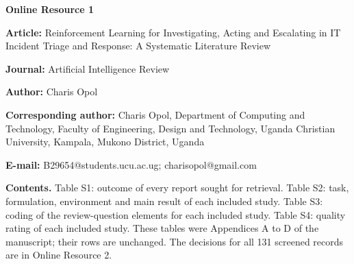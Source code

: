 \documentclass[10pt]{article}
\begin{document}
{\large\textbf{Online Resource 1}}\par\medskip
\textbf{Article:} Reinforcement Learning for Investigating, Acting and Escalating in IT Incident Triage and Response: A Systematic Literature Review\par
\textbf{Journal:} Artificial Intelligence Review\par
\textbf{Author:} Charis Opol\par
\textbf{Corresponding author:} Charis Opol, Department of Computing and Technology, Faculty of Engineering, Design and Technology, Uganda Christian University, Kampala, Mukono District, Uganda\par
\textbf{E-mail:} B29654@students.ucu.ac.ug; charisopol@gmail.com\par\medskip
\textbf{Contents.} Table S1: outcome of every report sought for retrieval. Table S2: task, formulation, environment and main result of each included study. Table S3: coding of the review-question elements for each included study. Table S4: quality rating of each included study. These tables were Appendices A to D of the manuscript; their rows are unchanged. The decisions for all 131 screened records are in Online Resource 2.
\bigskip
\end{document}
